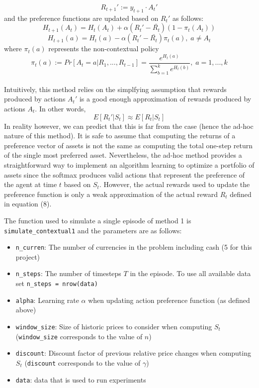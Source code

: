 \documentclass[a4paper,12pt]{article}
\newcommand{\code}[1]{\texttt{#1}}
\begin{document}
\begin{equation}
R_{t+1}' :=  y_{t+1} \cdot A_t'
\end{equation}
and the preference functions are updated based on $R_t'$ as follows:
\begin{equation}
H_{t+1}(A_t) = H_t(A_t) + \alpha (R_t' - \bar{R_t})(1 - \pi_t(A_t))
\end{equation}
\begin{equation}
H_{t+1}(a) = H_t(a) - \alpha (R_t' - \bar{R_t})\pi_t(a), \; a \neq A_t
\end{equation}
where $\pi_t(a)$ represents the non-contextual policy 
\begin{equation}
\pi_t (a) := Pr[A_t=a | R_1,...,R_{t-1}] = \frac{e^{H_t(a)}}{\sum_{b=1}^{k} e^{H_t(b)}}, \; a=1,...,k
\end{equation} \\
Intuitively, this method relies on the simplfying assumption that rewards produced by actions $A_t'$ is a good enough approximation of rewards produced by actions $A_t$. In other words, 
$$E[R_t' | S_t] \approx E[R_t | S_t]$$
In reality however, we can predict that this is far from the case (hence the ad-hoc nature of this method). It is safe to assume that computing the returns of a preference vector of assets is not the same as computing the total one-step return of the single most preferred asset. Nevertheless, the ad-hoc method provides a straightforward way to implement an algorithm learning to optimize a portfolio of assets since the softmax produces valid actions that represent the preference of the agent at time $t$ based on $S_t$. However, the actual rewards used to update the preference function is only a weak approximation of the actual reward $R_t$ defined in equation (8).

The function used to simulate a single episode of method 1 is \code{simulate\_contextual1} and the parameters are as follows:
\begin{itemize}
  \item \code{n\_curren}: The number of currencies in the problem including cash (5 for this project)
  \item \code{n\_steps}: The number of timesteps $T$ in the episode. To use all available data set \code{n\_steps = nrow(data)}
  \item \code{alpha}: Learning rate $\alpha$ when updating action preference function (as defined above)
  \item \code{window\_size}: Size of historic prices to consider when computing $S_t$ (\code{window\_size} corresponds to the value of $n$)
  \item \code{discount}: Discount factor of previous relative price changes when computing $S_t$ (\code{discount} corresponds to the value of $\gamma$)
  \item \code{data}: data that is used to run experiments
\end{itemize}
\end{document}
